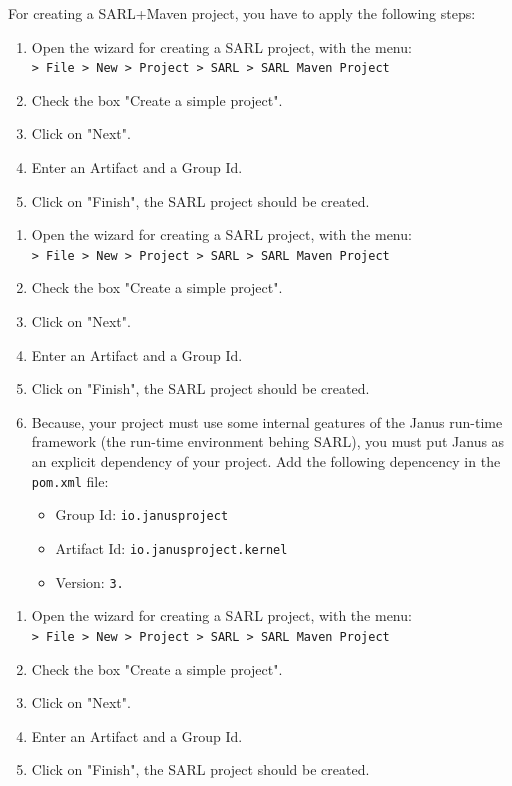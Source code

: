 For creating a SARL+Maven project, you have to apply the following steps:

\ifCODESKELETON
	\begin{enumerate}
	\item Open the wizard for creating a SARL project, with the menu: \\
		\texttt{> File > New > Project > SARL > SARL Maven Project}
	\item Check the box "Create a simple project".
	\item Click on "Next".
	\item Enter an Artifact and a Group Id.
	\item Click on "Finish", the SARL project should be created.
	\end{enumerate}
\else
	\ifJANUSINCLASSPATH
		\begin{enumerate}
		\item Open the wizard for creating a SARL project, with the menu: \\
			\texttt{> File > New > Project > SARL > SARL Maven Project}
		\item Check the box "Create a simple project".
		\item Click on "Next".
		\item Enter an Artifact and a Group Id.
		\item Click on "Finish", the SARL project should be created.
		\item Because, your project must use some internal geatures of the Janus run-time framework (the run-time environment behing SARL), you must put Janus as an explicit dependency of your project. Add the following depencency in the \texttt{pom.xml} file:
			\begin{itemize}
			\item Group Id: \texttt{io.janusproject}
			\item Artifact Id: \texttt{io.janusproject.kernel}
			\item Version: \texttt{3.\sarlversion}
			\end{itemize}
		\end{enumerate}
	\else
		\begin{enumerate}
		\item Open the wizard for creating a SARL project, with the menu: \\
			\texttt{> File > New > Project > SARL > SARL Maven Project}
		\item Check the box "Create a simple project".
		\item Click on "Next".
		\item Enter an Artifact and a Group Id.
		\item Click on "Finish", the SARL project should be created.
		\end{enumerate}
	\fi
\fi

